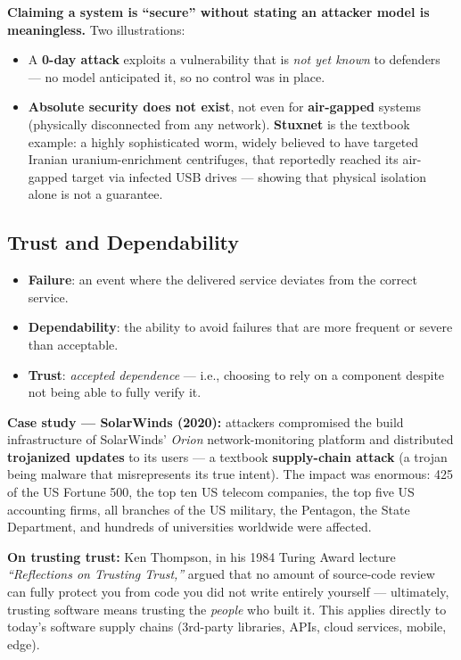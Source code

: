 \documentclass[12pt, a4paper]{article}
\begin{document}
\textcolor{red!70!black}{\textbf{Claiming a system is ``secure'' without stating an attacker model is meaningless.}} Two illustrations:
\begin{itemize}
    \item A \textbf{0-day attack} exploits a vulnerability that is \emph{not yet known} to defenders — no model anticipated it, so no control was in place.
    \item \textbf{Absolute security does not exist}, not even for \textbf{air-gapped} systems (physically disconnected from any network). \textbf{Stuxnet} is the textbook example: a highly sophisticated worm, widely believed to have targeted Iranian uranium-enrichment centrifuges, that reportedly reached its air-gapped target via infected USB drives — showing that physical isolation alone is not a guarantee.
\end{itemize}

\subsection{Trust and Dependability}
\begin{itemize}
    \item \textbf{Failure}: an event where the delivered service deviates from the correct service.
    \item \textbf{Dependability}: the ability to avoid failures that are more frequent or severe than acceptable.
    \item \textbf{Trust}: \emph{accepted dependence} — i.e., choosing to rely on a component despite not being able to fully verify it.
\end{itemize}

\textbf{Case study — SolarWinds (2020):} attackers compromised the build infrastructure of SolarWinds' \emph{Orion} network-monitoring platform and distributed \textbf{trojanized updates} to its users — a textbook \textbf{supply-chain attack} (a trojan being malware that misrepresents its true intent). The impact was enormous: 425 of the US Fortune 500, the top ten US telecom companies, the top five US accounting firms, all branches of the US military, the Pentagon, the State Department, and hundreds of universities worldwide were affected.

\textcolor{blue!50!black}{\textbf{On trusting trust:}} Ken Thompson, in his 1984 Turing Award lecture \emph{``Reflections on Trusting Trust,''} argued that no amount of source-code review can fully protect you from code you did not write entirely yourself — ultimately, trusting software means trusting the \emph{people} who built it. This applies directly to today's software supply chains (3rd-party libraries, APIs, cloud services, mobile, edge).
\end{document}
